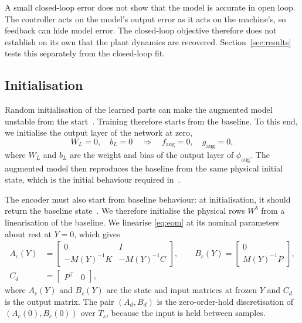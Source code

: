 A small closed-loop error does not show that the model is accurate in open
loop.
The controller acts on the model's output error as it acts on the
machine's, so feedback can hide model error.
The closed-loop objective therefore does not establish on its own that the
plant dynamics are recovered.
Section~\ref{sec:results} tests this separately from the closed-loop fit.

\subsection{Initialisation}\label{sec:aug_init}
Random initialisation of the learned parts can make the augmented model
unstable from the start~\cite[Sec.~5.4]{hoekstra2026lfr}.
Training therefore starts from the baseline.
To this end, we initialise the output layer of the network at zero,
\begin{equation}
 W_L=0,\quad b_L=0
 \quad\Longrightarrow\quad
 f_{\mathrm{aug}}=0,\quad g_{\mathrm{aug}}=0 ,
 \label{eq:aug_zero_init}
\end{equation}
where $W_L$ and $b_L$ are the weight and bias of the output layer of
$\phi_{\mathrm{aug}}$.
The augmented model then reproduces the baseline from the same physical
initial state, which is the initial behaviour required
in~\cite[Eq.~(29)]{hoekstra2026lfr}.

The encoder must also start from baseline behaviour: at initialisation, it
should return the baseline state~\cite[Sec.~5.4.2]{hoekstra2026lfr}.
We therefore initialise the physical rows $W^b$ from a linearisation of the
baseline.
We linearise \eqref{eq:eom} at its nominal parameters about rest at $Y=0$,
which gives
\begin{equation}
\begin{aligned}
 A_c(Y)&=\begin{bmatrix}0 & I\\ -M(Y)^{-1}K & -M(Y)^{-1}C\end{bmatrix},\qquad
 B_c(Y)=\begin{bmatrix}0\\ M(Y)^{-1}P\end{bmatrix},\\
 C_d&=\begin{bmatrix}P^\top & 0\end{bmatrix},
\end{aligned}
\label{eq:aug_lin}
\end{equation}
where $A_c(Y)$ and $B_c(Y)$ are the state and input matrices at frozen $Y$
and $C_d$ is the output matrix.
The pair $(A_d,B_d)$ is the zero-order-hold discretisation of
$(A_c(0),B_c(0))$ over $T_s$, because the input is held between samples.

